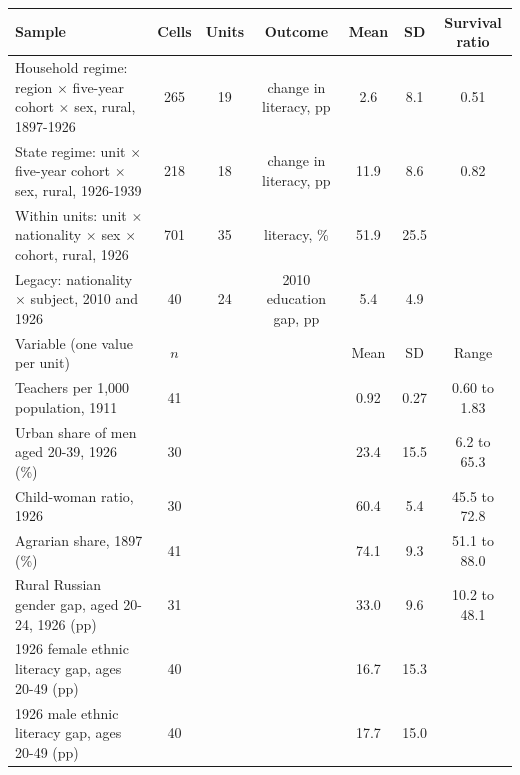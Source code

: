 \begin{tabular}{lcccccc}
\toprule
Sample & Cells & Units & Outcome & Mean & SD & Survival ratio \\
\midrule
Household regime: region $\times$ five-year cohort $\times$ sex, rural, 1897-1926 & 265 & 19 & change in literacy, pp & 2.6 & 8.1 & 0.51 \\
State regime: unit $\times$ five-year cohort $\times$ sex, rural, 1926-1939 & 218 & 18 & change in literacy, pp & 11.9 & 8.6 & 0.82 \\
Within units: unit $\times$ nationality $\times$ sex $\times$ cohort, rural, 1926 & 701 & 35 & literacy, \% & 51.9 & 25.5 & \\
Legacy: nationality $\times$ subject, 2010 and 1926 & 40 & 24 & 2010 education gap, pp & 5.4 & 4.9 & \\
\midrule
Variable (one value per unit) & $n$ & & & Mean & SD & Range \\
\midrule
Teachers per 1,000 population, 1911 & 41 & & & 0.92 & 0.27 & 0.60 to 1.83 \\
Urban share of men aged 20-39, 1926 (\%) & 30 & & & 23.4 & 15.5 & 6.2 to 65.3 \\
Child-woman ratio, 1926 & 30 & & & 60.4 & 5.4 & 45.5 to 72.8 \\
Agrarian share, 1897 (\%) & 41 & & & 74.1 & 9.3 & 51.1 to 88.0 \\
Rural Russian gender gap, aged 20-24, 1926 (pp) & 31 & & & 33.0 & 9.6 & 10.2 to 48.1 \\
1926 female ethnic literacy gap, ages 20-49 (pp) & 40 & & & 16.7 & 15.3 & \\
1926 male ethnic literacy gap, ages 20-49 (pp) & 40 & & & 17.7 & 15.0 & \\
\bottomrule
\end{tabular}

